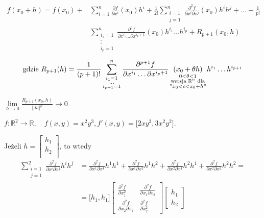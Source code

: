 \documentclass[../main.tex]{subfiles}
\begin{document}
\begin{align*}
f(x_0+h) = f(x_0) + &\sum_{i=1}^n \frac{\partial f}{\partial x^i} (x_0) h^i + \frac{1}{2!}\sum_{\substack{i=1\\ j=1}}^n \frac{\partial^2 f}{\partial x^i \partial x^j} (x_0) h^i h^j  + \dots + \frac{1}{p!}  \\
&\sum_{\substack{i_1 = 1\\ \vdots \\ i_p = 1}}^n \frac{\partial^p f}{\partial x^{i_1} \dots \partial x^{i_p+1}} (x_0) h^{i_1} \dots h^{i_p} + R_{p+1} (x_0, h)
\end{align*}
$$\text{gdzie } R_{p+1} (h) = \frac{1}{(p+1)!} \sum_{\substack{i_1 = 1\\ \dots \\i_{p+1} = 1}}^n \frac{\partial^{p+1} f}{\partial x^{i_1} \dots \partial x^{i_p+1}} \underset{\substack{0<\theta<1\\ \text{ wersja } \mathbb{R}^n \text{ dla }\\"x_0 < c < x_0 +h"}}{(x_0+\theta h)} h^{i_1} \dots h^{i_{p+1}}$$

\begin{obserwacja}
$\lim\limits_{h \to 0}\frac{R_{p+1} (x_0,h)}{||h||^p} \to 0$
\end{obserwacja}

\begin{przyklad}

\end{przyklad}
$f: \mathbb{R}^2 \to \mathbb{R}, \quad f(x,y) = x^2y^3, f'(x,y) = \Big [ 2xy^3, 3x^2y^2 \Big ]$.

Jeżeli $h = \left [ \begin{matrix}
h_1\\
h_2\\
 \end{matrix}\right ]$, to wtedy
\begin{align*}
\sum_{\substack{i=1 \\ j=1}}^2 \frac{\partial^2 f}{\partial x^i \partial x^j} h^i h^j
&=\frac{\partial^2 f}{\partial x^1 \partial x^1} h^1 h^1 + \frac{\partial^2 f}{\partial x^1 \partial x^2} h^1 h^2 + \frac{\partial^2 f}{\partial x^2 \partial x^1} h^2 h^1 + \frac{\partial^2 f}{\partial x^2 \partial x^2} h^2 h^2 =\\
&= \Big [ h_1, h_1 \Big ] \left [ \begin{matrix}
\frac{\partial^2 f}{\partial x_1^2}  &\frac{\partial^2 f}{\partial x_1 \partial x_2} \\
\frac{\partial^2 f}{\partial x_2 \partial x_1}  &\frac{\partial^2 f}{\partial x_2^2}  \end{matrix}\right ] \left [ \begin{matrix}
h_1\\
h_2 \end{matrix}\right ]
\end{align*}
\end{document}
